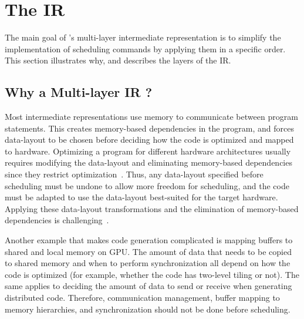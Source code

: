 \vspace{-0.5cm}
\section{\label{sec:ir}The \framework{} IR}
The main goal of \framework{}'s multi-layer intermediate representation is to simplify the implementation of scheduling commands by applying them in a specific order.
This section illustrates why, and describes the layers of the \framework{} IR.
\vspace{-0.4cm}
\subsection{Why a Multi-layer IR ?}

Most intermediate representations use memory to communicate between program statements.  This creates memory-based dependencies in the program, and forces data-layout to be chosen before deciding how the code is optimized and mapped to hardware.  Optimizing a program for different hardware architectures usually requires modifying the data-layout and eliminating memory-based dependencies since they restrict optimization~\cite{maydan1992data}.  Thus, any data-layout specified before scheduling must be undone to allow more freedom for scheduling, and the code must be adapted to use the data-layout best-suited for the target hardware.
Applying these data-layout transformations and the elimination of memory-based dependencies is challenging~\cite{gupta1997privatization,autoPrivatPeng,li_array_1992,feautrier_array_1988,midkiff_automatic_2012,maydan_array-data_1993,lefebvre_automatic_1998,Qui00,Darte_contraction_2005}.

Another example that makes code generation complicated is mapping buffers to shared and local memory on GPU.  The amount of data that needs to be copied to shared memory and when to perform synchronization all depend on how the code is optimized (for example,  whether the code has two-level tiling or not).  The same applies to deciding the amount of data to send or receive when generating distributed code.   Therefore, communication management, buffer mapping to memory hierarchies, and synchronization should not be done before scheduling.

